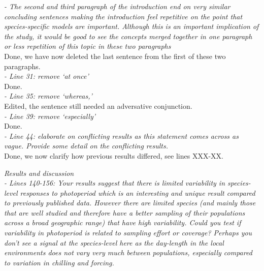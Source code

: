 \documentclass[11pt]{article}
\begin{document}
\emph{- The second and third paragraph of the introduction end on very similar concluding sentences making the introduction feel repetitive on the point that species-specific models are important. Although this is an important implication of the study, it would be good to see the concepts merged together in one paragraph or less repetition of this topic in these two paragraphs}\\
Done, we have now deleted the last sentence from the first of these two paragraphs.\\

\emph{- Line 31: remove ‘at once’}\\
Done.\\

\emph{- Line 35: remove ‘whereas,’}\\
Edited, the sentence still needed an adversative conjunction.\\

\emph{- Line 39: remove ‘especially’}\\
Done.\\

\emph{- Line 44: elaborate on conflicting results as this statement comes across as vague. Provide some detail on the conflicting results.}\\
Done, we now clarify how previous results differed, see lines XXX-XX.

\emph{Results and discussion}\\
\emph{- Lines 140-156: Your results suggest that there is limited variability in species-level responses to photoperiod which is an interesting and unique result compared to previously published data. However there are limited species (and mainly those that are well studied and therefore have a better sampling of their populations across a broad geographic range) that have high variability. Could you test if variability in photoperiod is related to sampling effort or coverage? Perhaps you don’t see a signal at the species-level here as the day-length in the local environments does not vary very much between populations, especially compared to variation in chilling and forcing.}\\
\end{document}
